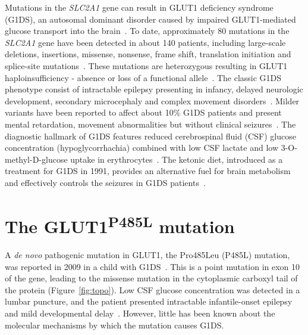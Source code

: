 Mutations in the \textit{SLC2A1} gene can result in GLUT1 deficiency syndrome (G1DS), an autosomal dominant disorder caused by impaired GLUT1-mediated glucose transport into the brain~\cite{De,Klepper}. To date, approximately 80 mutations in the \textit{SLC2A1} gene have been detected in about 140 patients, including large-scale deletions, insertions, missense, nonsense, frame shift, translation initiation and splice-site mutations~\cite{Wang, Leen}. These mutations are heterozygous resulting in GLUT1 haploinsufficiency - absence or loss of a functional allele~\cite{Klepper,Leen}. The classic G1DS phenotype consist of intractable epilepsy presenting in infancy, delayed neurologic development, secondary microcephaly and complex movement disorders~\cite{De,Klepper}. Milder variants have been reported to affect about 10\% G1DS patients and present mental retardation, movement abnormalities but without clinical seizures~\cite{Wang,Suls}. The diagnostic hallmark of G1DS features reduced cerebrospinal fluid (CSF) glucose concentration (hypoglycorrhachia) combined with low CSF lactate and low 3-O-methyl-D-glucose uptake in erythrocytes~\cite{Wang,Klepper.2}. The ketonic diet, introduced as a treatment for G1DS in 1991, provides an alternative fuel for brain metabolism and effectively controls the seizures in G1DS patients~\cite{Wang}.

 \section{The GLUT1\textsuperscript{P485L} mutation}

A \textit{de novo} pathogenic mutation in GLUT1, the Pro485Leu (P485L) mutation, was reported in 2009 in a child with G1DS~\cite{Slaughter}. This is a point mutation in exon 10 of the gene, leading to the missense mutation in the cytoplasmic carboxyl tail of the protein (Figure~\ref{fig:topo}). Low CSF glucose concentration was detected in a lumbar puncture, and the patient presented intractable infantile-onset epilepsy and mild developmental delay~\cite{Slaughter}. However, little has been known about the molecular mechanisms by which the mutation causes G1DS.

